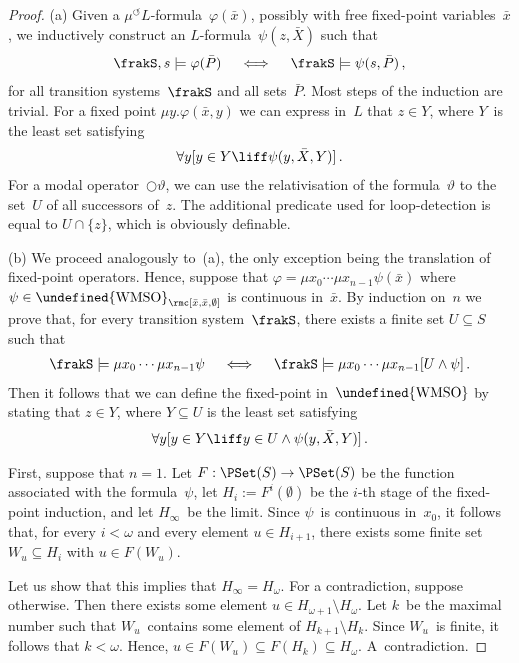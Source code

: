 \documentclass[10pt, fleqn]{scrartcl}
\makeatletter
\newcommand\m@thsm@ller[2]{\mbox{\relscale{0.91}$\m@th#1#2$}}
\let\smaller\undefined
\DeclareRobustCommand\smaller[1]{\relax\ifmmode{\mathpalette\m@thsm@ller{#1}}\else{\relscale{0.91}#1}\fi}
\newcommand*{\WMSO}{\smaller{\mathrm{WMSO}}}
\newcommand*{\?}{\kern .08em}
\newcommand\medcircle{\bigcirc}
\newcommand\rcirclearrowleft{\circlearrowleft}
\makeatother
\begin{document}
\begin{proof}
(a)
Given a $\mu^\rcirclearrowleft L$-formula~$\varphi(\bar x)$, possibly with free fixed-point
variables~$\bar x$, we inductively construct an $L$-formula~$\psi(z,\bar X)$ such that
\begin{align*}
  \frakS,s \models \varphi(\bar P) \quad\iff\quad \frakS \models \psi(s,\bar P)\,,
\end{align*}
for all transition systems~$\frakS$ and all sets~$\bar P$.
Most steps of the induction are trivial. For a fixed point $\mu y.\varphi(\bar x,y)$
we can express in~$L$ that $z \in Y$, where $Y$~is the least set satisfying
\begin{align*}
  \forall y[y \in Y \liff \psi(y,\bar X,Y)]\,.
\end{align*}
For a modal operator~${\medcircle}\vartheta$, we can use the relativisation of the
formula~$\vartheta$ to the set~$U$ of all successors of~$z$. The additional
predicate used for loop-detection is equal to $U \cap \{z\}$, which is obviously definable.

(b) We proceed analogously to~(a), the only exception being the translation of
fixed-point operators.
Hence, suppose that $\varphi = \mu x_0\cdots\mu x_{n-1}\psi(\bar x)$
where $\psi \in \WMSO_\rmc[\bar x,\bar x,\emptyset]$ is continuous in~$\bar x$.
By induction on~$n$ we prove that, for every transition system~$\frakS$,
there exists a finite set $U \subseteq S$ such that
\begin{align*}
  \frakS \models \mu x_0\cdots\mu x_{n-1}\psi
  \quad\iff\quad
  \frakS \models \mu x_0\cdots\mu x_{n-1}[U \land \psi]\,.
\end{align*}
Then it follows that we can define the fixed-point in~$\WMSO$ by stating that
$z \in Y$, where $Y \subseteq U$ is the least set satisfying
\begin{align*}
  \forall y[y \in Y \liff y \in U \land \psi(y,\bar X,Y)]\,.
\end{align*}

First, suppose that $n = 1$. Let $F : \PSet(S) \to \PSet(S)$ be the function associated with
the formula~$\psi$, let $H_i := F^i(\emptyset)$ be the $i$-th stage of the fixed-point
induction, and let $H_\infty$~be the limit.
Since $\psi$~is continuous in~$x_0$, it follows that, for every $i < \omega$ and every
element $u \in H_{i+1}$, there exists some finite set $W_u \subseteq H_i$ with $u \in F(W_u)$.

Let us show that this implies that $H_\infty = H_\omega$.
For a contradiction, suppose otherwise. Then there exists some element
$u \in H_{\omega+1} \setminus H_\omega$.
Let $k$~be the maximal number such that $W_u$~contains some element of $H_{k+1} \setminus H_k$.
Since $W_u$~is finite, it follows that $k < \omega$.
Hence, $u \in F(W_u) \subseteq F(H_k) \subseteq H_\omega$. A~contradiction.


\end{proof}
\end{document}
